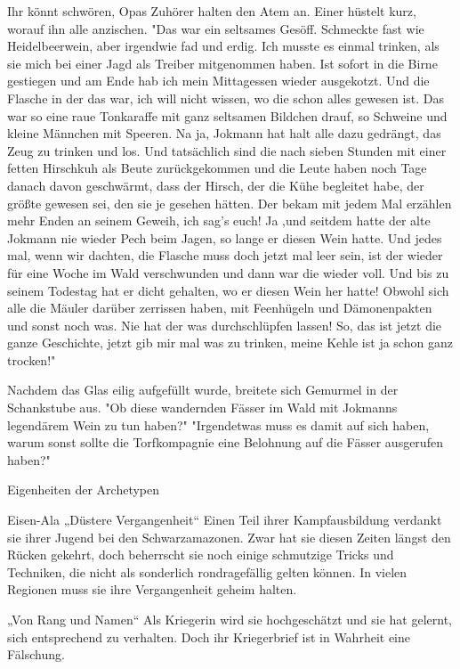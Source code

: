Ihr könnt schwören, Opas Zuhörer halten den Atem an. Einer hüstelt kurz, worauf ihn alle anzischen. "Das war ein seltsames Gesöff. Schmeckte fast wie Heidelbeerwein, aber irgendwie fad und erdig. Ich musste es einmal trinken, als sie mich bei einer Jagd als Treiber mitgenommen haben. Ist sofort in die Birne gestiegen und am Ende hab ich mein Mittagessen wieder ausgekotzt. Und die Flasche in der das war, ich will nicht wissen, wo die schon alles gewesen ist. Das war so eine raue Tonkaraffe mit ganz seltsamen Bildchen drauf, so Schweine und kleine Männchen mit Speeren. 
Na ja, Jokmann hat halt alle dazu gedrängt, das Zeug zu trinken und los. Und tatsächlich sind die nach sieben Stunden mit einer fetten Hirschkuh als Beute zurückgekommen und die Leute haben noch Tage danach davon geschwärmt, dass der Hirsch, der die Kühe begleitet habe, der größte gewesen sei, den sie je gesehen hätten. Der bekam mit jedem Mal erzählen mehr Enden an seinem Geweih, ich sag's euch! 
Ja ,und seitdem hatte der alte Jokmann nie wieder Pech beim Jagen, so lange er diesen Wein hatte. Und jedes mal, wenn wir dachten, die Flasche muss doch jetzt mal leer sein, ist der wieder für eine Woche im Wald verschwunden und dann war die wieder voll. Und bis zu seinem Todestag hat er dicht gehalten, wo er diesen Wein her hatte! Obwohl sich alle die Mäuler darüber zerrissen haben, mit Feenhügeln und Dämonenpakten und sonst noch was. Nie hat der was durchschlüpfen lassen! So, das ist jetzt die ganze Geschichte, jetzt gib mir mal was zu trinken, meine Kehle ist ja schon ganz trocken!"

Nachdem das Glas eilig aufgefüllt wurde, breitete sich Gemurmel in der Schankstube aus. "Ob diese wandernden Fässer im Wald mit Jokmanns legendärem Wein zu tun haben?" "Irgendetwas muss es damit auf sich haben, warum sonst sollte die Torfkompagnie eine Belohnung auf die Fässer ausgerufen haben?"







Eigenheiten der Archetypen

Eisen-Ala
„Düstere Vergangenheit“
Einen Teil ihrer Kampfausbildung verdankt sie ihrer Jugend bei den Schwarzamazonen. Zwar hat sie diesen Zeiten längst den Rücken gekehrt, doch beherrscht sie noch einige schmutzige Tricks und Techniken, die nicht als sonderlich rondragefällig gelten können. In vielen Regionen muss sie ihre Vergangenheit geheim halten.

„Von Rang und Namen“
Als Kriegerin wird sie hochgeschätzt und sie hat gelernt, sich entsprechend zu verhalten. Doch ihr Kriegerbrief ist in Wahrheit eine Fälschung.


